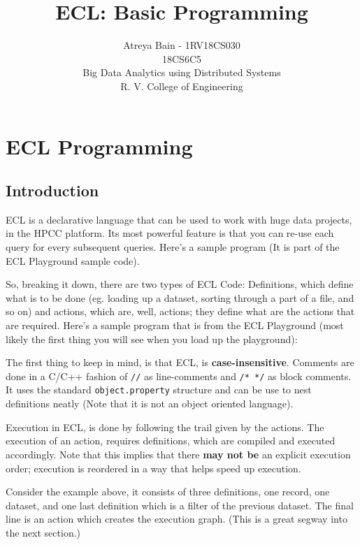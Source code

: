\documentclass[a4paper,oneside,12pt]{book}
\title{ECL: Basic Programming}
\author{Atreya Bain - 1RV18CS030\\18CS6C5\\Big Data Analytics using Distributed Systems\\R. V. College of Engineering}
\begin{document}
\maketitle{}%
\tableofcontents
\renewcommand{\arraystretch}{1.25}
\pagebreak

\part{ECL Programming}

\chapter{Introduction}

ECL is a declarative language that can be used to work with huge data projects, in the HPCC platform. Its most powerful feature is that you can re-use each query for every subsequent queries. Here's a sample program (It is part of the ECL Playground sample code).

So, breaking it down, there are two types of ECL Code: Definitions, which define what is to be done (eg. loading up a dataset, sorting through a part of a file, and so on) and actions, which are, well, actions; they define what are the actions that are required. Here's a sample program that is from the ECL Playground (most likely the first thing you will see when you load up the playground):



The first thing to keep in mind, is that ECL, is \textbf{case-insensitive}. Comments are done in a C/C++ fashion of \lstinline!//! as line-comments and \lstinline!/* */! as block comments. It uses the standard \lstinline!object.property! structure and can be use to nest definitions neatly (Note that it is not an object oriented language).

Execution in ECL, is done by following the trail given by the actions. The execution of an action, requires definitions, which are compiled and executed accordingly. Note that this implies that there \textbf{may not be} an explicit execution order; execution is reordered in a way that helps speed up execution.

Consider the example above, it consists of three definitions, one record, one dataset, and one last definition which is a filter of the previous dataset.
The final line is an action which creates the execution graph. (This is a great segway into the next section.)
\end{document}
